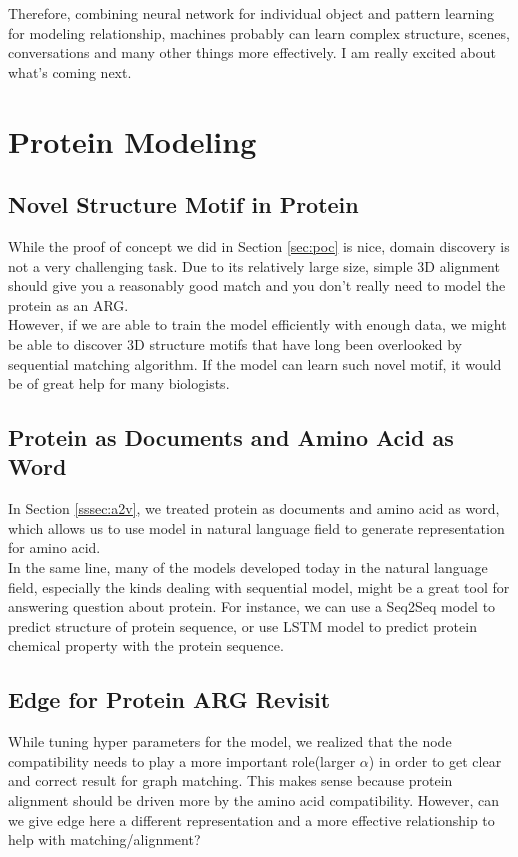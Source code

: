 Therefore, combining neural network for individual object and pattern learning for modeling relationship, machines probably can learn complex structure, scenes, conversations and many other things more effectively. I am really excited about what's coming next.

\section{Protein Modeling}

\subsection{Novel Structure Motif in Protein}

While the proof of concept we did in Section \ref{sec:poc} is nice, domain discovery is not a very challenging task. Due to its relatively large size, simple 3D alignment should give you a reasonably good match and you don't really need to model the protein as an ARG.\\

However, if we are able to train the model efficiently with enough data, we might be able to discover 3D structure motifs that have long been overlooked by sequential matching algorithm. If the model can learn such novel motif, it would be of great help for many biologists.

\subsection{Protein as Documents and Amino Acid as Word}

In Section \ref{sssec:a2v}, we treated protein as documents and amino acid as word, which allows us to use model in natural language field to generate representation for amino acid.\\

In the same line, many of the models developed today in the natural language field, especially the kinds dealing with sequential model, might be a great tool for answering question about protein. For instance, we can use a Seq2Seq model to predict structure of protein sequence, or use LSTM model to predict protein chemical property with the protein sequence.


\subsection{Edge for Protein ARG Revisit}

While tuning hyper parameters for the model, we realized that the node compatibility needs to play a more important role(larger $\alpha$) in order to get clear and correct result for graph matching. This makes sense because protein alignment should be driven more by the amino acid compatibility. However, can we give edge here a different representation and a more effective relationship to help with matching/alignment?

